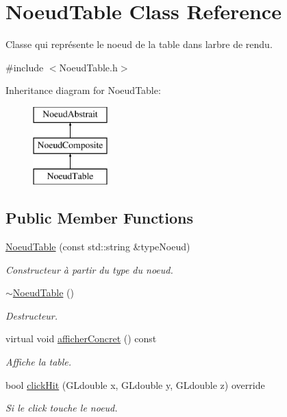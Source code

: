 \hypertarget{class_noeud_table}{}\section{Noeud\+Table Class Reference}
\label{class_noeud_table}


Classe qui représente le noeud de la table dans l\textquotesingle{}arbre de rendu.  




{\ttfamily \#include $<$Noeud\+Table.\+h$>$}

Inheritance diagram for Noeud\+Table\+:\begin{figure}[H]
\begin{center}
\leavevmode
\includegraphics[height=3.000000cm]{class_noeud_table}
\end{center}
\end{figure}
\subsection*{Public Member Functions}
{\bf }\par
\begin{DoxyCompactItemize}
\item 
\hyperlink{class_noeud_table_a40983870720b331d17daeeb306e12ef5}{Noeud\+Table} (const std\+::string \&type\+Noeud)
\begin{DoxyCompactList}\small\item\em Constructeur à partir du type du noeud. \end{DoxyCompactList}\item 
\hyperlink{class_noeud_table_a6171c2df59de6f454f0d8c7915403ce7}{$\sim$\+Noeud\+Table} ()
\begin{DoxyCompactList}\small\item\em Destructeur. \end{DoxyCompactList}\item 
virtual void \hyperlink{class_noeud_table_aa2876d070dd6fe57b0b90077fcd5036d}{afficher\+Concret} () const 
\begin{DoxyCompactList}\small\item\em Affiche la table. \end{DoxyCompactList}\item 
\hypertarget{class_noeud_table_a75ee424199cdc37e8e2b1280505b93c6}{}bool \hyperlink{class_noeud_table_a75ee424199cdc37e8e2b1280505b93c6}{click\+Hit} (G\+Ldouble x, G\+Ldouble y, G\+Ldouble z) override\label{class_noeud_table_a75ee424199cdc37e8e2b1280505b93c6}

\begin{DoxyCompactList}\small\item\em Si le click touche le noeud. \end{DoxyCompactList}\end{DoxyCompactItemize}

